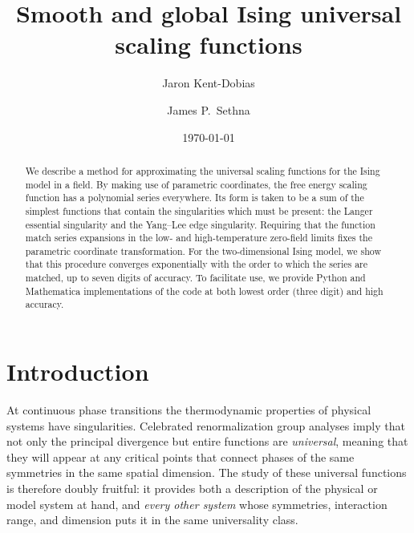 \documentclass[
aps,
pre,
preprint,
longbibliography,
floatfix
]{revtex4-2}
\begin{document}
\title{Smooth and global Ising universal scaling functions}

\author{Jaron Kent-Dobias}

\author{James P.~Sethna}

\date\today

\begin{abstract}
  We describe a method for approximating the universal scaling functions for
  the Ising model in a field. By making use of parametric coordinates, the free
  energy scaling function has a polynomial series everywhere. Its form is
  taken to be a sum of the simplest functions that contain the singularities
  which must be present: the Langer essential singularity and the Yang--Lee
  edge singularity. Requiring that the function match series expansions in
  the low- and high-temperature zero-field limits fixes the parametric
  coordinate transformation. For the two-dimensional Ising model, we show that
  this procedure converges exponentially with the order to which the series are
  matched, up to seven digits of accuracy.
  To facilitate use, we provide Python and Mathematica implementations of the code at both lowest order (three digit) and high accuracy.
\end{abstract}

\maketitle

\section{Introduction}

At continuous phase transitions the thermodynamic properties of physical
systems have singularities. Celebrated renormalization group analyses imply
that not only the principal divergence but entire functions are
\emph{universal}, meaning that they will appear at any critical points that
connect phases of the same symmetries in the same spatial dimension. The study
of these universal functions is therefore doubly fruitful: it provides both a
description of the physical or model system at hand, and \emph{every other
system} whose symmetries, interaction range, and dimension puts it in the same
universality class.
\end{document}
